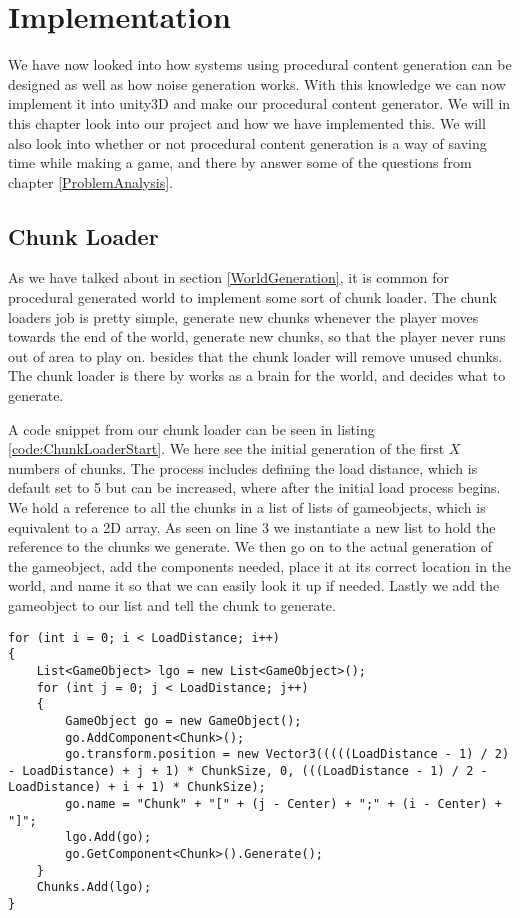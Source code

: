 \chapter{Implementation}

We have now looked into how systems using procedural content generation can be designed as well as how noise generation works. With this knowledge we can now implement it into unity3D and make our procedural content generator. We will in this chapter look into our project and how we have implemented this. We will also look into whether or not procedural content generation is a way of saving time while making a game, and there by answer some of the questions from chapter \ref{ProblemAnalysis}.


\section{Chunk Loader}

As we have talked about in section \ref{WorldGeneration}, it is common for procedural generated world to implement some sort of chunk loader. The chunk loaders job is pretty simple, generate new chunks whenever the player moves towards the end of the world, generate new chunks, so that the player never runs out of area to play on. besides that the chunk loader will remove unused chunks. The chunk loader is there by works as a brain for the world, and decides what to generate.

A code snippet from our chunk loader can be seen in listing \ref{code:ChunkLoaderStart}. We here see the initial generation of the first $X$ numbers of chunks. The process includes defining the load distance, which is default set to 5 but can be increased, where after the initial load process begins. We hold a reference to all the chunks in a list of lists of gameobjects, which is equivalent to a 2D array. As seen on line 3 we instantiate a new list to hold the reference to the chunks we generate. We then go on to the actual generation of the gameobject, add the components needed, place it at its correct location in the world, and name it so that we can easily look it up if needed. Lastly we add the gameobject to our list and tell the chunk to generate.

\begin{lstlisting}[caption = Code snippet from the start method in the ChunkLoader script., label=code:ChunkLoaderStart, language=Csharp]
for (int i = 0; i < LoadDistance; i++)
{
	List<GameObject> lgo = new List<GameObject>();
	for (int j = 0; j < LoadDistance; j++)
	{
		GameObject go = new GameObject();
		go.AddComponent<Chunk>();
		go.transform.position = new Vector3(((((LoadDistance - 1) / 2) - LoadDistance) + j + 1) * ChunkSize, 0, (((LoadDistance - 1) / 2 - LoadDistance) + i + 1) * ChunkSize);
		go.name = "Chunk" + "[" + (j - Center) + ";" + (i - Center) + "]";
		lgo.Add(go);
		go.GetComponent<Chunk>().Generate();
	}
	Chunks.Add(lgo);
}
\end{lstlisting}


